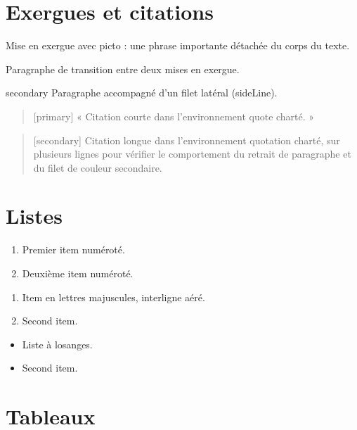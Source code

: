 \section{Exergues et citations}

\pictoExergue[primary] Mise en exergue avec picto : une phrase importante détachée du corps du texte.


Paragraphe de transition entre deux mises en exergue.


\begin{sideLine}{secondary}
Paragraphe accompagné d'un filet latéral (sideLine).
\end{sideLine}

\begin{quote}[primary]
« Citation courte dans l'environnement quote charté. »
\end{quote}

\begin{quotation}[secondary]
Citation longue dans l'environnement quotation charté, sur plusieurs lignes pour vérifier le comportement du retrait de paragraphe et du filet de couleur secondaire.
\end{quotation}

\section{Listes}

\begin{enumerate}[arabic][primary]
  \item Premier item numéroté.
  \item Deuxième item numéroté.
\end{enumerate}

\begin{enumerate}[Alph][secondary][loose]
  \item Item en lettres majuscules, interligne aéré.
  \item Second item.
\end{enumerate}

\begin{itemize}[diamond][secondary]
  \item Liste à losanges.
  \item Second item.
\end{itemize}

\section{Tableaux}

